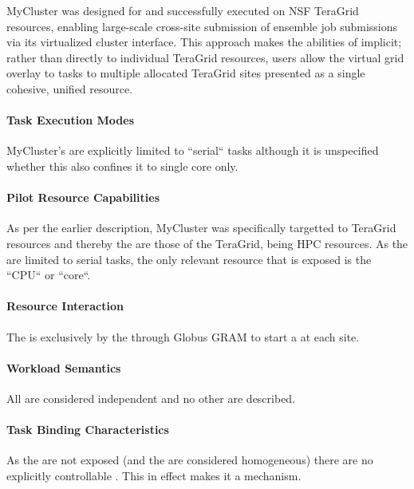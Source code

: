 \documentclass{sig-alternate}
\begin{document}
MyCluster was designed for and successfully executed on NSF TeraGrid
resources, enabling large-scale cross-site submission of ensemble
job submissions via its virtualized cluster interface.
This approach makes the  abilities
of \pilot implicit; rather than directly 
to individual TeraGrid resources, users allow the virtual grid
overlay to  tasks to multiple allocated TeraGrid sites
presented as a single cohesive, unified resource.

\paragraph{Task Execution Modes}
MyCluster's  are explicitly limited to
``serial`` tasks although it is unspecified whether this also confines
it to single core  only.

\paragraph{Pilot Resource Capabilities}
As per the earlier description, MyCluster was specifically targetted to
TeraGrid resources and thereby the  are
those of the TeraGrid, being HPC resources.
As the  are limited to serial tasks, the only
relevant resource that is exposed is the ``CPU`` or ``core``.

\paragraph{Resource Interaction}
The  is exclusively by the 
through Globus GRAM to start a  at each site.

\paragraph{Workload Semantics}
All  are considered independent and no other  are described.

\paragraph{Task Binding Characteristics}
As the \pilots are not exposed (and the  are considered
homogeneous) there are no explicitly controllable . This in effect makes it a  mechanism.
\end{document}
